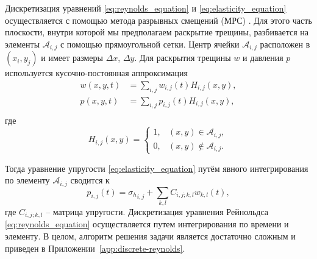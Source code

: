 Дискретизация уравнений \eqref{eq:reynolds_equation} и \eqref{eq:elasticity_equation} осуществляется с помощью метода разрывных смещений (МРС) \cite{dispalecement_discontinuty_Crouch1983}. Для этого часть плоскости, внутри которой мы предполагаем раскрытие трещины, разбивается на элементы $\mathcal{A}_{i,j}$ с помощью прямоугольной сетки. Центр ячейки $\mathcal{A}_{i,j}$ расположен в $(x_i,y_j)$ и имеет размеры $\Delta x$, $\Delta y$. Для раскрытия трещины $w$ и давления $p$ используется кусочно-постоянная аппроксимация
\begin{equation}
    \label{eq:piecewiece_approximation}
    \begin{split}
        w(x,y,t) &= \sum\limits_{i,j} w_{i,j}(t) H_{i,j}(x,y), \\
        p(x,y,t) &= \sum\limits_{i,j} p_{i,j}(t) H_{i,j}(x,y), \\
    \end{split}
\end{equation}
где 
\begin{equation}
    \label{eq:heaviside_function}
    H_{i,j}(x,y) = \left\{
        \begin{array}{ll}
            1, & (x,y) \in \mathcal{A}_{i,j}, \\
            0, & (x,y) \notin \mathcal{A}_{i,j}.
        \end{array}\right.
\end{equation}

Тогда уравнение упругости \eqref{eq:elasticity_equation} путём явного интегрирования по элементу $\mathcal{A}_{i,j}$ сводится к
\begin{equation}
    \label{eq:discrete_elasticity}
    p_{i,j}(t) = {\sigma_h}_{i,j} + \sum\limits_{k,l} C_{i,j;k,l} w_{k,l}(t),
\end{equation}
где $C_{i,j;k,l}$ -- матрица упругости. Дискретизация уравнения Рейнольдса \eqref{eq:reynolds_equation} осуществляется путем интегрирования по времени и элементу. В целом, алгоритм решения задачи \cite{DONTSOV201753} является достаточно сложным и приведен в Приложении~\ref{app:discrete-reynolds}.